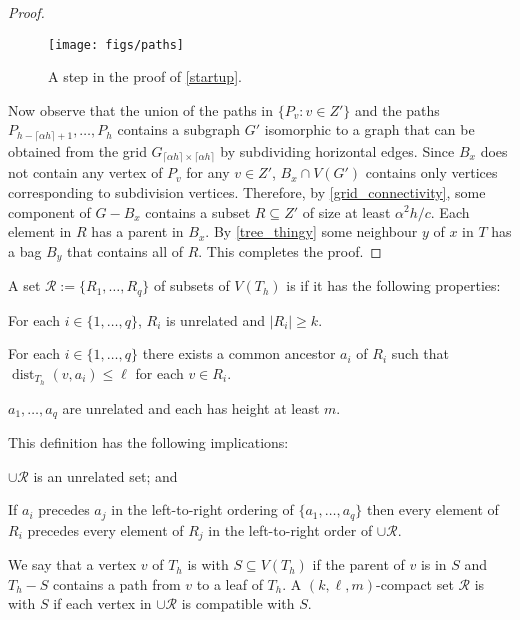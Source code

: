 \documentclass{patmorin}
\DeclareMathOperator{\dist}{dist}
\renewcommand{\le}{\leqslant}
\renewcommand{\ge}{\geqslant}
\begin{document}
\begin{proof}
  \begin{figure}
    \begin{center}
      \texttt{[image: figs/paths]}
    \end{center}
    \caption{A step in the proof of \cref{startup}.}
    \label{paths}
  \end{figure}

  Now observe that the union of the paths in  $\{P_{v}:v\in Z'\}$ and the paths $P_{h-\lceil\alpha h\rceil+1},\ldots,P_{h}$ contains a subgraph $G'$ isomorphic to a graph that can be obtained from the grid $G_{\lceil \alpha h\rceil\times\lceil \alpha h\rceil}$ by subdividing horizontal edges.  Since $B_x$ does not contain any vertex of $P_{v}$ for any $v\in Z'$,  $B_x\cap V(G')$ contains only vertices corresponding to subdivision vertices.  Therefore, by \cref{grid_connectivity}, some component of $G-B_x$ contains a subset $R\subseteq Z'$ of size at least $\alpha^2 h/c$.  Each element in $R$ has a parent in $B_x$.  By \cref{tree_thingy} some neighbour $y$ of $x$ in $T$ has a bag $B_y$ that contains all of $R$.  This completes the proof.
\end{proof}



A set $\mathcal{R}:=\{R_1,\ldots,R_q\}$ of subsets of $V(T_h)$ is  if it has the following properties:

\begin{compactenum}
  \item For each $i\in\{1,\ldots,q\}$, $R_i$ is unrelated and $|R_i|\ge k$.
  \item For each $i\in\{1,\ldots,q\}$ there exists a common ancestor $a_i$ of $R_i$ such that $\dist_{T_h}(v,a_i)\le\ell$ for each $v\in R_i$.
  \item $a_1,\ldots,a_q$ are unrelated and each has height at least $m$.
\end{compactenum}

This definition has the following implications:
\begin{inparaenum}[(i)]
  \item $\cup \mathcal{R}$ is an unrelated set; and
  \item If $a_i$ precedes $a_j$ in the left-to-right ordering of $\{a_1,\ldots,a_q\}$ then every element of $R_i$ precedes every element of $R_j$ in the left-to-right order of $\cup\mathcal{R}$.
\end{inparaenum}
We say that a vertex $v$ of $T_h$ is  with $S\subseteq V(T_h)$ if the parent of $v$ is in $S$ and $T_h-S$ contains a path from $v$ to a leaf of $T_h$.  A $(k,\ell,m)$-compact set $\mathcal{R}$ is  with $S$ if each vertex in $\cup\mathcal{R}$ is compatible with $S$.
\end{document}
